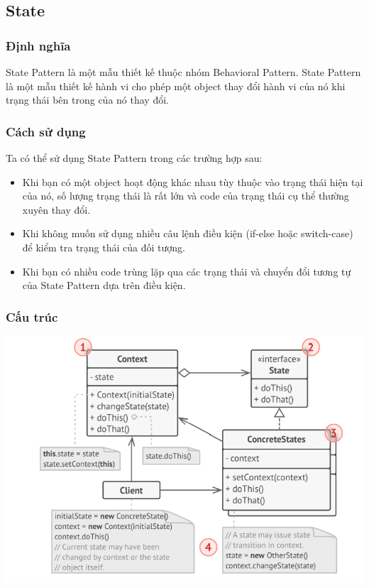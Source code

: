 \subsection{State}
\subsubsection{Định nghĩa}
State Pattern là một mẫu thiết kế thuộc nhóm Behavioral Pattern. State Pattern là một mẫu thiết kế hành vi cho phép một object thay đổi hành vi của nó khi trạng thái bên trong của nó thay đổi.
\subsubsection{Cách sử dụng}
Ta có thể sử dụng State Pattern trong các trường hợp sau:
\begin{itemize}
    \item Khi bạn có một object hoạt động khác nhau tùy thuộc vào trạng thái hiện tại của nó, số lượng trạng thái là rất lớn và code của trạng thái cụ thể thường xuyên thay đổi.
    \item Khi không muốn sử dụng nhiều câu lệnh điều kiện (if-else hoặc switch-case) để kiểm tra trạng thái của đối tượng.
    \item Khi bạn có nhiều code trùng lặp qua các trạng thái và chuyển đổi tương tự của State Pattern dựa trên điều kiện.
\end{itemize}
\subsubsection{Cấu trúc}
\begin{center}
    \includegraphics[scale=0.6]{image/behavioral/state.png}
\end{center}
